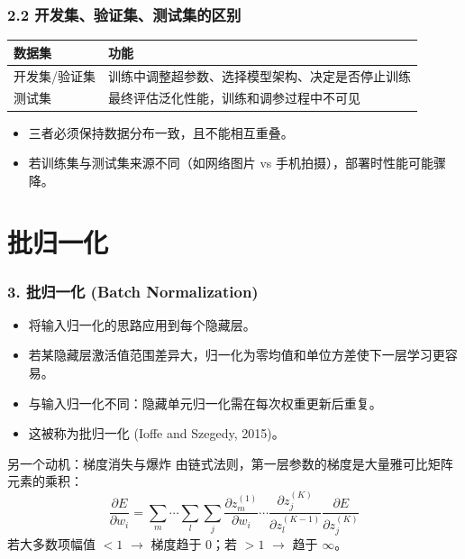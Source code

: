 \documentclass[t,aspectratio=169]{beamer} %
\begin{document}
\begin{frame}
    \frametitle{2.2 开发集、验证集、测试集的区别}
    \begin{table}
        \centering
        \renewcommand{\arraystretch}{1.3}
        \begin{tabular}{|p{3cm}|p{9.5cm}|}
            \hline
            \textbf{数据集} & \textbf{功能} \\
            \hline
            开发集/验证集 & 训练中调整超参数、选择模型架构、决定是否停止训练 \\
            \hline
            测试集 & 最终评估泛化性能，训练和调参过程中\alert{不可见} \\
            \hline
        \end{tabular}
    \end{table}
    \begin{itemize}
        \item 三者必须保持\alert{数据分布一致}，且不能相互重叠。
        \item 若训练集与测试集来源不同（如网络图片 vs 手机拍摄），部署时性能可能骤降。
    \end{itemize}
\end{frame}

\section{批归一化}

\begin{frame}
    \frametitle{3. 批归一化 (Batch Normalization)}
    \begin{itemize}
        \item 将输入归一化的思路应用到\alert{每个隐藏层}。
        \item 若某隐藏层激活值范围差异大，归一化为零均值和单位方差使\alert{下一层学习更容易}。
        \item 与输入归一化不同：隐藏单元归一化需在\alert{每次权重更新后重复}。
        \item 这被称为\alert{批归一化} (Ioffe and Szegedy, 2015)。
    \end{itemize}
    \begin{block}{另一个动机：梯度消失与爆炸}
        由链式法则，第一层参数的梯度是大量雅可比矩阵元素的乘积：
        \begin{equation}
            \frac{\partial E}{\partial w_i} = 
            \sum_m \cdots \sum_l \sum_j 
            \frac{\partial z_m^{(1)}}{\partial w_i}
            \cdots
            \frac{\partial z_j^{(K)}}{\partial z_l^{(K-1)}}
            \frac{\partial E}{\partial z_j^{(K)}} \tag{7.51}
        \end{equation}
        若大多数项幅值 $<1$ $\rightarrow$ 梯度趋于 0；若 $>1$ $\rightarrow$ 趋于 $\infty$。
    \end{block}
\end{frame}
\end{document}
